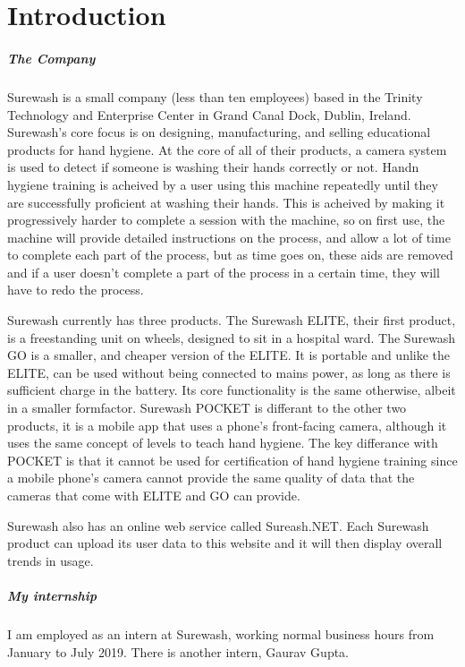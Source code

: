 \part{Introduction}
\subsubsection{The Company}
Surewash is a small company (less than ten employees) based in the Trinity Technology and Enterprise Center in Grand Canal Dock, Dublin, Ireland. Surewash's core focus is on designing, manufacturing, and selling educational products for hand hygiene. At the core of all of their products, a camera system is used to detect if someone is washing their hands correctly or not. Handn hygiene training is acheived by a user using this machine repeatedly until they are successfully proficient at washing their hands. This is acheived by making it progressively harder to complete a session with the machine, so on first use, the machine will provide detailed instructions on the process, and allow a lot of time to complete each part of the process, but as time goes on, these aids are removed and if a user doesn't complete a part of the process in a certain time, they will have to redo the process.

Surewash currently has three products. The Surewash ELITE, their first product, is a freestanding unit on wheels, designed to sit in a hospital ward. The Surewash GO is a smaller, and cheaper version of the ELITE. It is portable and unlike the ELITE, can be used without being connected to mains power, as long as there is sufficient charge in the battery. Its core functionality is the same otherwise, albeit in a smaller formfactor. Surewash POCKET is differant to the other two products, it is a mobile app that uses a phone's front-facing camera, although it uses the same concept of levels to teach hand hygiene. The key differance with POCKET is that it cannot be used for certification of hand hygiene training since a mobile phone's camera cannot provide the same quality of data that the cameras that come with ELITE and GO can provide.

Surewash also has an online web service called Sureash.NET. Each Surewash product can upload its user data to this website and it will then display overall trends in usage.

\subsubsection{My internship}
I am employed as an intern at Surewash, working normal business hours from January to July 2019. There is another intern, Gaurav Gupta.